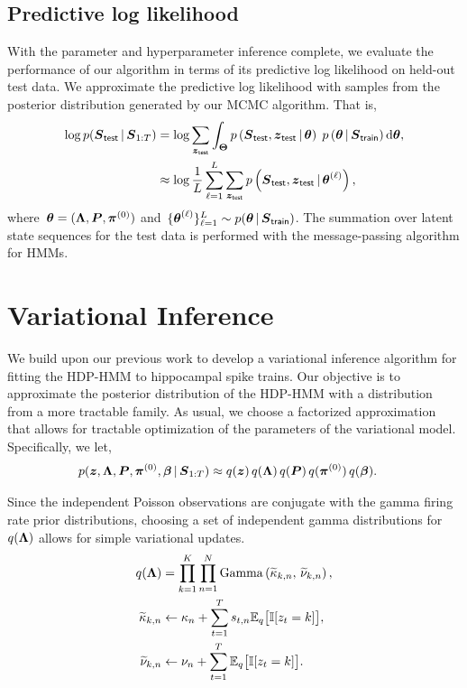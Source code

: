 \subsection{Predictive log likelihood}
With the parameter and hyperparameter inference complete, we evaluate
the performance of our algorithm in terms of its predictive log
likelihood on held-out test data. We approximate the predictive log
likelihood with samples from the posterior distribution generated by
our MCMC algorithm. That is,
\begin{align*}
\log p(\boldsymbol{S}_{\mathsf{test}} \,|\, \boldsymbol{S}_{1:T}) &= \log \sum_{\boldsymbol{z}_{\mathsf{test}}} \int_{\boldsymbol{\Theta}} p\left(\boldsymbol{S}_{\mathsf{test}}, \boldsymbol{z}_{\mathsf{test}} \,|\, \boldsymbol{\theta} \right) \; p\left(\boldsymbol{\theta} \,|\, \boldsymbol{S}_{\mathsf{train}} \right) \mathrm{d}\boldsymbol{\theta}, \\
&\approx \log \frac{1}{L} \sum_{\ell=1}^L \sum_{\boldsymbol{z}_{\mathsf{test}}} p\left(\boldsymbol{S}_{\mathsf{test}},  \boldsymbol{z}_{\mathsf{test}} \,|\, \boldsymbol{\theta}^{(\ell)} \right),
\end{align*}
where~${\boldsymbol{\theta}=(\boldsymbol{\Lambda}, \boldsymbol{P}, \boldsymbol{\pi}^{(0)})}$ and~$\{\boldsymbol{\theta}^{(\ell)} \}_{\ell=1}^L
\sim p(\boldsymbol{\theta} \,|\, \boldsymbol{S}_{\mathsf{train}})$. The summation over latent state
sequences for the test data is performed with the message-passing
algorithm for HMMs.

\section{Variational Inference}



We build upon our previous work \citep{Chen12a,Chen14,Johnson14} to
develop a variational inference algorithm for fitting the HDP-HMM to
hippocampal spike trains. Our objective is to approximate the
posterior distribution of the HDP-HMM with a distribution from a more
tractable family. As usual, we choose a factorized approximation that
allows for tractable optimization of the parameters of the variational
model. Specifically, we let,
\begin{align*}
  p(\boldsymbol{z}, \boldsymbol{\Lambda}, \boldsymbol{P}, \boldsymbol{\pi}^{(0)}, \boldsymbol{\beta} \,|\, \boldsymbol{S}_{1:T}) 
  &\approx q(\boldsymbol{z}) \, q(\boldsymbol{\Lambda}) \, q(\boldsymbol{P}) \, q(\boldsymbol{\pi}^{(0)}) \, q(\boldsymbol{\beta}).
\end{align*}

Since the independent Poisson observations are conjugate with the
gamma firing rate prior distributions, choosing a set of independent
gamma distributions for~$q(\boldsymbol{\Lambda})$ allows for simple variational
updates.
\begin{align*}
  q(\boldsymbol{\Lambda}) &= \prod_{k=1}^K \prod_{n=1}^N \mathrm{Gamma}\left(\widetilde{\kappa}_{k,n},\, \widetilde{\nu}_{k,n} \right), \\
  \widetilde{\kappa}_{k,n} &\leftarrow \kappa_n + \sum_{t=1}^T s_{t,n} \mathbb{E}_q\big[\mathbb{I}[z_t=k]\big], \\
  \widetilde{\nu}_{k,n} &\leftarrow \nu_n + \sum_{t=1}^T \mathbb{E}_q\big[\mathbb{I}[z_t=k]\big].
\end{align*}

